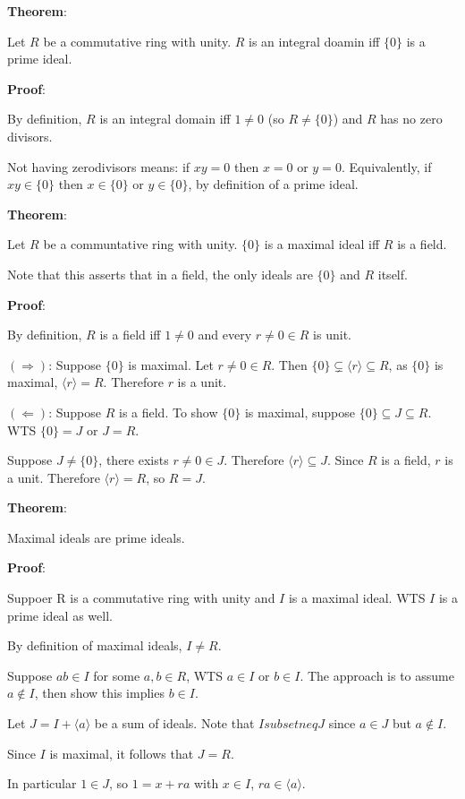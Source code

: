 \documentclass{article}
\begin{document}
\begin{multicols*}{2}
\textbf{Theorem}:

Let $R$ be a commutative ring with unity. $R$ is an integral doamin iff $\{0\}$ is a prime ideal.

\textbf{Proof}:

By definition, $R$ is an integral domain iff $1 \neq 0$ (so $R \neq \{0\}$) and $R$ has no zero divisors.

Not having zerodivisors means: if $xy = 0$ then $x=0$ or $y = 0$. Equivalently, if $xy \in \{0\}$ then $x \in \{0\}$ or $y \in \{0\}$, by definition of a prime ideal.

\textbf{Theorem}:

Let $R$ be a communtative ring with unity. $\{0\}$ is a maximal ideal iff $R$ is a field.

Note that this asserts that in a field, the only ideals are $\{0\}$ and $R$ itself.

\textbf{Proof}:

By definition, $R$ is a field iff  $1 \neq 0$ and every $r \neq 0 \in R$ is unit.

$(\Rightarrow)$: Suppose $\{0\}$ is maximal. Let $r \neq 0 \in R$. Then $\{0\} \subsetneq \langle r \rangle \subseteq R$, as $\{0\}$ is maximal, $\langle r \rangle = R$. Therefore $r$ is a unit.

$(\Leftarrow)$: Suppose $R$ is a field. To show $\{0\}$ is maximal, suppose $\{0\} \subseteq J \subseteq R$. WTS $\{0\} = J$ or $J = R$.

Suppose $J \neq \{0\}$, there exists $r \neq 0 \in J$. Therefore $\langle r \rangle \subseteq J$. Since $R$ is a field, $r$ is a unit. Therefore $\langle r \rangle = R$, so $R = J$.

\textbf{Theorem}:

Maximal ideals are prime ideals.

\textbf{Proof}:

Suppoer R is a commutative ring with unity and $I$ is a maximal ideal. WTS $I$ is a prime ideal as well.

By definition of maximal ideals, $I \neq R$.

Suppose $ab \in I$ for some $a, b \in R$, WTS $a \in I$ or $b \in I$. The approach is to assume $a \notin I$, then show this implies $b \in I$.

Let $J = I + \langle a \rangle$  be a sum of ideals. Note that $I subsetneq J$ since $a \in J$ but $a \notin I
$. 

Since $I$ is maximal, it follows that $J = R$. 

In particular $1 \in J$, so $1 = x + ra$ with $x \in I$, $ra \in \langle a \rangle$.


\end{multicols*}
\end{document}
